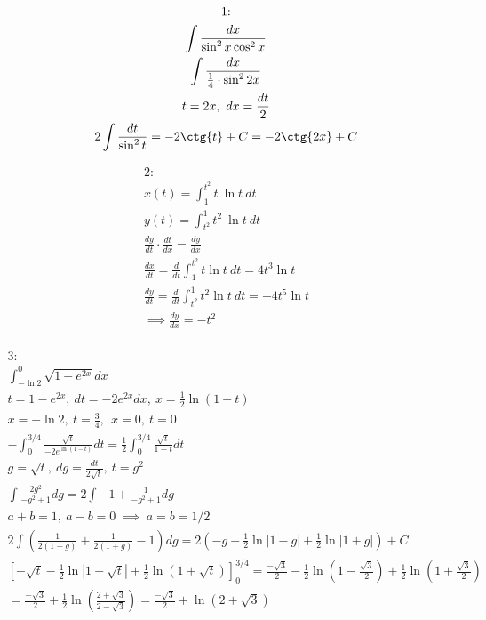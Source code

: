 
\begin{multline}
    \text{1:}\\
    \int \frac{dx}{\sin^{2}{x} \cos^{2}{x}}\\
    \int \frac{dx}{\frac{1}{4} \cdot \sin^{2}{2x}}\\
    t = 2x,\ dx = \frac{dt}{2}\\
    2 \int \frac{dt}{\sin^{2}{t} } = -2\ctg{t} + C = -2\ctg{2x} + C\\
\end{multline}

\begin{multline}
    \text{2:}\\
    x(t) = \int_{1}^{t^{2}} t\ \ln{t}\ dt\\
    y(t) = \int_{t^{2}}^{1} t^{2}\ \ln{t}\ dt\\
    \frac{dy}{dt} \cdot \frac{dt}{dx} = \frac{dy}{dx}\\
    \frac{dx}{dt} = \frac{d}{dt} \int_{1}^{t^2} {t \ln{t}}\ dt = 4t^{3} \ln{t}\\
    \frac{dy}{dt} = \frac{d}{dt} \int_{t^2}^{1} {t^{2} \ln{t}}\ dt = -4t^{5} \ln{t}\\
    \implies \frac{dy}{dx} = -t^{2}\\
\end{multline}



\begin{multline}
    \text{3:}\\
    \int_{-\ln{2}}^{0} \sqrt{1 - e^{2x}} dx\\
    t = 1 - e^{2x},\ dt = -2e^{2x} dx,\ x = \frac{1}{2} \ln{(1-t)}\\
    x = -\ln{2},\ t = \frac{3}{4},\ \ x = 0,\ t = 0\\
    -\int_{0}^{3/4} \frac{\sqrt{t}}{-2e^{\ln{(1-t)}}} dt = \frac{1}{2} \int_{0}^{3/4} \frac{\sqrt{t}}{1 - t} dt\\
    g = \sqrt{t},\ dg = \frac{dt}{2\sqrt{t}},\ t = g^{2}\\
    \int \frac{2g^{2}}{-g^{2} + 1} dg = 2 \int -1 + \frac{1}{-g^{2} + 1} dg\\
    a + b = 1,\ a - b = 0\ \implies\ a = b = 1/2\\
    2 \int (\frac{1}{2(1 - g)} + \frac{1}{2(1 + g)} - 1) dg = 2(-g - \frac{1}{2} \ln{|1 - g|} + \frac{1}{2} \ln{|1 + g|}) + C\\
    [-\sqrt{t} - \frac{1}{2} \ln{|1 - \sqrt{t}|} + \frac{1}{2} \ln{(1 + \sqrt{t})}]_{0}^{3/4} = \frac{-\sqrt{3}}{2} - \frac{1}{2} \ln{(1 - \frac{\sqrt{3}}{2})} + \frac{1}{2} \ln{(1 + \frac{\sqrt{3}}{2})}\\
    = \frac{-\sqrt{3}}{2} + \frac{1}{2} \ln{(\frac{2 + \sqrt{3}}{2 - \sqrt{3}})} = \frac{-\sqrt{3}}{2} + \ln{(2 + \sqrt{3})}\\
\end{multline}



